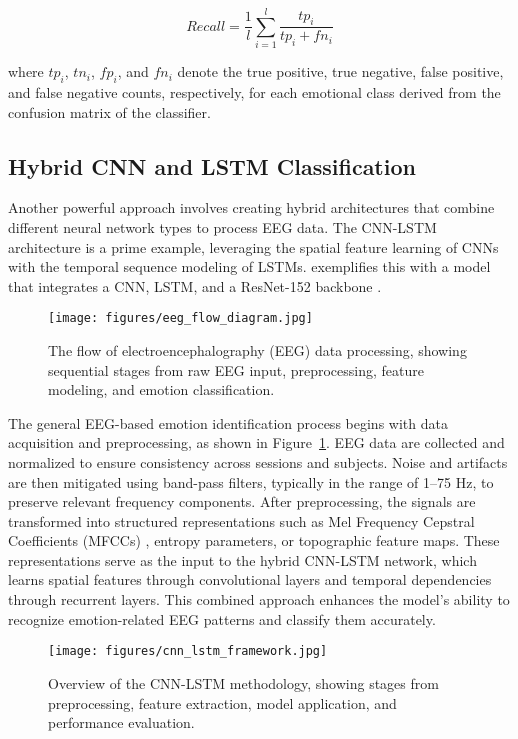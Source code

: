 \documentclass[conference]{IEEEtran}
\begin{document}
\begin{equation}
Recall = \frac{1}{l} \sum_{i=1}^{l} \frac{tp_i}{tp_i + fn_i}
\end{equation}

where \(tp_i\), \(tn_i\), \(fp_i\), and \(fn_i\) denote the true positive, true negative, false positive, and false negative counts, respectively, for each emotional class derived from the confusion matrix of the classifier.


\subsection{Hybrid CNN and LSTM Classification}
Another powerful approach involves creating hybrid architectures that combine different neural network types to process EEG data. The CNN-LSTM architecture is a prime example, leveraging the spatial feature learning of CNNs with the temporal sequence modeling of LSTMs. \cite{Chakravarthi2022EEGHybridCNNLSTM} exemplifies this with a model that integrates a CNN, LSTM, and a ResNet-152 backbone \cite{Shanmugasundaram2024APLResNet152}.

\begin{figure}[H]
    \centering
    \texttt{[image: figures/eeg\_flow\_diagram.jpg]}
    \caption{The flow of electroencephalography (EEG) data processing, showing sequential stages from raw EEG input, preprocessing, feature modeling, and emotion classification.}
    \label{fig:eeg_flow}
\end{figure}

The general EEG-based emotion identification process begins with data acquisition and preprocessing, as shown in Figure~\ref{fig:eeg_flow}. EEG data are collected and normalized to ensure consistency across sessions and subjects. Noise and artifacts are then mitigated using band-pass filters, typically in the range of 1–75 Hz, to preserve relevant frequency components. After preprocessing, the signals are transformed into structured representations such as Mel Frequency Cepstral Coefficients (MFCCs) \cite{Chakravarthi2022EEGHybridCNNLSTM}, entropy parameters, or topographic feature maps. These representations serve as the input to the hybrid CNN-LSTM network, which learns spatial features through convolutional layers and temporal dependencies through recurrent layers. This combined approach enhances the model’s ability to recognize emotion-related EEG patterns and classify them accurately.

\begin{figure}[H]
    \centering
    \texttt{[image: figures/cnn\_lstm\_framework.jpg]}
    \caption{Overview of the CNN-LSTM methodology, showing stages from preprocessing, feature extraction, model application, and performance evaluation.}
    \label{fig:cnn_lstm_framework}
\end{figure}
\end{document}
